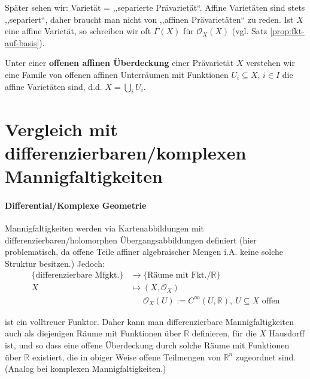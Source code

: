 Später sehen wir: Varietät = ,,separierte Prävarietät``. Affine
Varietäten sind stets ,,separiert``, daher braucht man nicht von
,,affinen Prävarietäten`` zu reden. Ist $X$ eine affine Varietät,
so schreiben wir oft $\Gamma(X)$ für $\mathcal{O}_{X}(X)$ (vgl. Satz
\ref{prop:fkt-auf-basis}).

Unter einer \textbf{offenen affinen Überdeckung} einer Prävarietät
$X$ verstehen wir eine Famile von offenen affinen Unterräumen mit Funktionen
$U_{i}\subseteq X$, $i\in I$ die affine Varietäten sind, d.d. $X=\bigcup_i U_{i}$.

\section{Vergleich mit differenzierbaren/komplexen Mannigfaltigkeiten}
\label{sec:vergleich-mit-mannigfaltigkeiten}

\paragraph{Differential/Komplexe Geometrie}

Mannigfaltigkeiten werden via Kartenabbildungen mit differenzierbaren/holomorphen
Übergangsabbildungen definiert (hier problematisch, da offene Teile
affiner algebraischer Mengen i.A. keine solche Struktur besitzen.)
Jedoch:
\begin{align*}
  \text{\{differenzierbare Mfgkt.\}} & \longrightarrow\text{\{Räume mit Fkt.}/\mathbb{R}\}\\
  X & \longmapsto(X,\mathcal{O}_{X})\\
                                     & \phantom{\longmapsto}\mathcal{O}_{X}(U):=C^{\infty}(U,\mathbb{R}),\ U\subseteq X\text{ offen}
\end{align*}

ist ein volltreuer Funktor. Daher kann man differenzierbare Mannigfaltigkeiten
auch als diejenigen Räume mit Funktionen über $\mathbb{R}$ definieren,
für die $X$ Hausdorff ist, und so dass eine offene Überdeckung durch
solche Räume mit Funktionen über $\mathbb{R}$ existiert, die in obiger
Weise offene Teilmengen von $\mathbb{R}^{n}$ zugeordnet sind. (Analog
bei komplexen Mannigfaltigkeiten.)
